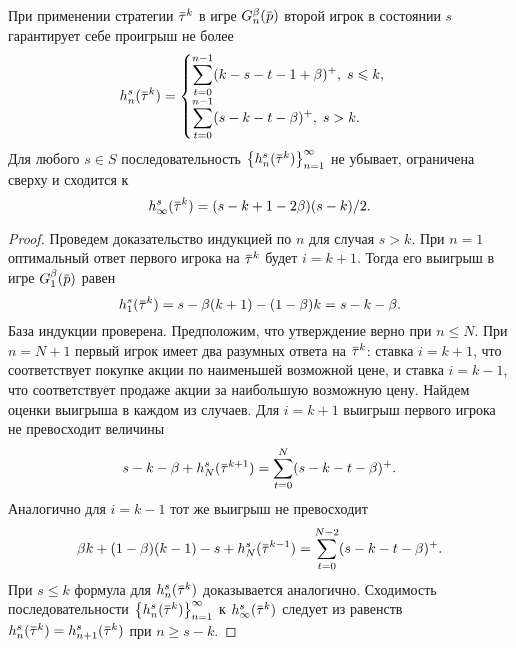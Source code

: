 {\begin{lemma}
  \label{ch2:upper-bound:lemma:vector-payoffs}
  При применении стратегии $\tauv^k$ в игре $\theG(\p)$ второй игрок в состоянии $s$ гарантирует себе проигрыш не более
  \begin{gather*}
    h^s_n(\tauv^k) = \begin{cases}
      \displaystyle \sum_{t=0}^{n-1} (k-s-t-1+\beta)^+, \; s \leqslant k, \\
      \displaystyle \sum_{t=0}^{n-1} (s-k-t-\beta)^+, \; s > k.
    \end{cases} 
  \end{gather*}
  Для любого $s \in S$ последовательность $\left\{ h^s_n(\tauv^k) \right\}_{n = 1}^\infty$ не убывает, ограничена сверху и сходится к %
  \begin{equation}
    \label{ch2:upper-bound:eq:max-payoff}
    h^s_\infty(\tauv^k) = (s - k + 1 - 2\beta)(s-k)/2.
  \end{equation}
\end{lemma}
\begin{proof}
  Проведем доказательство индукцией по $n$ для случая $s > k$.
  При $n = 1$ оптимальный ответ первого игрока на $\tauv^k$ будет $i = k + 1$.
  Тогда его выигрыш в игре $\theG[1](\p)$ равен
  \begin{equation*}
    h^s_1(\tauv^k) = s - \beta(k+1) - (1-\beta)k = s - k - \beta.
  \end{equation*}
  База индукции проверена.
  Предположим, что утверждение верно при $n \leqslant N$.
  При $n = N + 1$ первый игрок имеет два разумных ответа на $\tauv^k$: ставка $i=k+1$, что соответствует покупке акции по наименьшей возможной цене, и ставка $i=k-1$, что соответствует продаже акции за наибольшую возможную цену.
  Найдем оценки выигрыша в каждом из случаев.
  Для $i=k+1$ выигрыш первого игрока не превосходит величины
  \begin{equation*}
    s - k - \beta + h^s_N(\tauv^{k+1}) = \sum_{t=0}^N(s-k-t-\beta)^+.
  \end{equation*}
  Аналогично для $i = k - 1$ тот же выигрыш не превосходит
  \begin{equation*}
    \beta k + (1-\beta)(k-1) - s + h^s_N(\tauv^{k-1}) = \sum_{t=0}^{N-2}(s-k-t-\beta)^+.
  \end{equation*}
  При $s \leqslant k$ формула для $h^s_n(\tauv^k)$ доказывается аналогично.
  Сходимость последовательности $\left\{  h^s_n(\tauv^k) \right\}_{n=1}^\infty$ к $h^s_\infty(\tauv^k)$ следует из равенств
  $h^s_n(\tauv^k) = h^s_{n+1}(\tauv^k)$ при $n \geqslant s - k$.
\end{proof}

}
